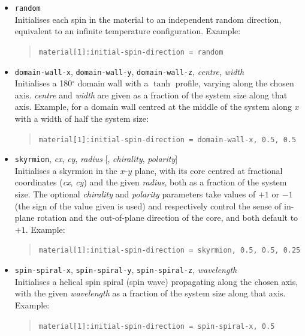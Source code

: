 \begin{itemize}

\item \verb|random| \\
Initialises each spin in the material to an independent random direction, equivalent to an infinite temperature configuration. Example:
\begin{quote}
\verb|material[1]:initial-spin-direction = random|
\end{quote}

\item \verb|domain-wall-x|, \verb|domain-wall-y|, \verb|domain-wall-z|, \emph{centre}, \emph{width} \\
Initialises a 180$^\circ$ domain wall with a $\tanh$ profile, varying along the chosen axis. \emph{centre} and \emph{width} are given as a fraction of the system size along that axis. Example, for a domain wall centred at the middle of the system along $x$ with a width of half the system size:
\begin{quote}
\verb|material[1]:initial-spin-direction = domain-wall-x, 0.5, 0.5|
\end{quote}

\item \verb|skyrmion|, \emph{cx}, \emph{cy}, \emph{radius} [, \emph{chirality}, \emph{polarity}] \\
Initialises a skyrmion in the $x$-$y$ plane, with its core centred at fractional coordinates (\emph{cx}, \emph{cy}) and the given \emph{radius}, both as a fraction of the system size. The optional \emph{chirality} and \emph{polarity} parameters take values of $+1$ or $-1$ (the sign of the value given is used) and respectively control the sense of in-plane rotation and the out-of-plane direction of the core, and both default to $+1$. Example:
\begin{quote}
\verb|material[1]:initial-spin-direction = skyrmion, 0.5, 0.5, 0.25|
\end{quote}

\item \verb|spin-spiral-x|, \verb|spin-spiral-y|, \verb|spin-spiral-z|, \emph{wavelength} \\
Initialises a helical spin spiral (spin wave) propagating along the chosen axis, with the given \emph{wavelength} as a fraction of the system size along that axis. Example:
\begin{quote}
\verb|material[1]:initial-spin-direction = spin-spiral-x, 0.5|
\end{quote}


\end{itemize}

